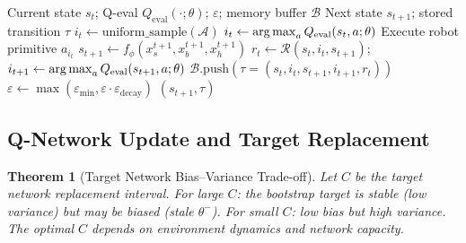 \documentclass[12pt,a4paper]{article}
\theoremstyle{definition}
\theoremstyle{plain}
\newtheorem{theorem}{Theorem}[section]
\theoremstyle{remark}
\newcommand{\argmax}{\operatornamewithlimits{arg\,max}}
\newcommand{\Qeval}{Q_{\text{eval}}}
\begin{document}
\begin{algorithm}[H]
\caption{Robot Interaction and Transition Generation}
\label{alg:robot_interact}
\begin{algorithmic}[1]
\Require Current state $s_t$; Q-eval $\Qeval(\cdot;\theta)$; $\varepsilon$; memory buffer $\mathcal{B}$
\Ensure Next state $s_{t+1}$; stored transition $\tau$
  \State $i_t \gets \text{uniform\_sample}(\mathcal{A})$ 
\Else
  \State $i_t \gets \argmax_{a} \Qeval(s_t, a;\theta)$ 
\EndIf
\State Execute robot primitive $a_{i_t}$
\State $s_{t+1} \gets f_\phi(x_s^{t+1}, x_b^{t+1}, x_h^{t+1})$ 
\State $r_t \gets \mathcal{R}(s_t, i_t, s_{t+1})$; $i_{t+1} \gets \argmax_a \Qeval(s_{t+1}, a;\theta)$
\State $\mathcal{B}.\text{push}(\tau = (s_t, i_t, s_{t+1}, i_{t+1}, r_t))$
\State $\varepsilon \gets \max(\varepsilon_{\min}, \varepsilon \cdot \varepsilon_{\text{decay}})$
\State \Return $(s_{t+1}, \tau)$
\end{algorithmic}
\end{algorithm}

\subsection{Q-Network Update and Target Replacement}

\begin{theorem}[Target Network Bias--Variance Trade-off]
\label{thm:target}
Let $C$ be the target network replacement interval. For large $C$: the bootstrap target is stable (low variance) but may be biased (stale $\theta^-$). For small $C$: low bias but high variance. The optimal $C$ depends on environment dynamics and network capacity.
\end{theorem}
\end{document}
